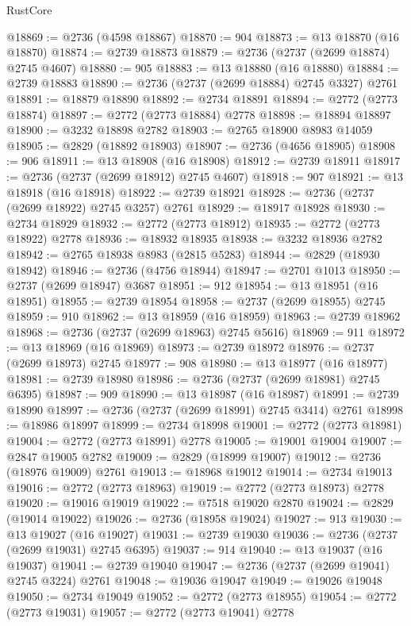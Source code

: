 \begin{lexlean}{RustCore}
\begin{coremodule}
@18869 := @2736 (@4598 @18867)
@18870 := 904
@18873 := @13 @18870 (@16 @18870)
@18874 := @2739 @18873
@18879 := @2736 (@2737 (@2699 @18874) @2745 @4607)
@18880 := 905
@18883 := @13 @18880 (@16 @18880)
@18884 := @2739 @18883
@18890 := @2736 (@2737 (@2699 @18884) @2745 @3327) @2761
@18891 := @18879 @18890
@18892 := @2734 @18891
@18894 := @2772 (@2773 @18874)
@18897 := @2772 (@2773 @18884) @2778
@18898 := @18894 @18897
@18900 := @3232 @18898 @2782
@18903 := @2765 @18900 @8983 @14059
@18905 := @2829 (@18892 @18903)
@18907 := @2736 (@4656 @18905)
@18908 := 906
@18911 := @13 @18908 (@16 @18908)
@18912 := @2739 @18911
@18917 := @2736 (@2737 (@2699 @18912) @2745 @4607)
@18918 := 907
@18921 := @13 @18918 (@16 @18918)
@18922 := @2739 @18921
@18928 := @2736 (@2737 (@2699 @18922) @2745 @3257) @2761
@18929 := @18917 @18928
@18930 := @2734 @18929
@18932 := @2772 (@2773 @18912)
@18935 := @2772 (@2773 @18922) @2778
@18936 := @18932 @18935
@18938 := @3232 @18936 @2782
@18942 := @2765 @18938 @8983 (@2815 @5283)
@18944 := @2829 (@18930 @18942)
@18946 := @2736 (@4756 @18944)
@18947 := @2701 @1013
@18950 := @2737 (@2699 @18947) @3687
@18951 := 912
@18954 := @13 @18951 (@16 @18951)
@18955 := @2739 @18954
@18958 := @2737 (@2699 @18955) @2745
@18959 := 910
@18962 := @13 @18959 (@16 @18959)
@18963 := @2739 @18962
@18968 := @2736 (@2737 (@2699 @18963) @2745 @5616)
@18969 := 911
@18972 := @13 @18969 (@16 @18969)
@18973 := @2739 @18972
@18976 := @2737 (@2699 @18973) @2745
@18977 := 908
@18980 := @13 @18977 (@16 @18977)
@18981 := @2739 @18980
@18986 := @2736 (@2737 (@2699 @18981) @2745 @6395)
@18987 := 909
@18990 := @13 @18987 (@16 @18987)
@18991 := @2739 @18990
@18997 := @2736 (@2737 (@2699 @18991) @2745 @3414) @2761
@18998 := @18986 @18997
@18999 := @2734 @18998
@19001 := @2772 (@2773 @18981)
@19004 := @2772 (@2773 @18991) @2778
@19005 := @19001 @19004
@19007 := @2847 @19005 @2782
@19009 := @2829 (@18999 @19007)
@19012 := @2736 (@18976 @19009) @2761
@19013 := @18968 @19012
@19014 := @2734 @19013
@19016 := @2772 (@2773 @18963)
@19019 := @2772 (@2773 @18973) @2778
@19020 := @19016 @19019
@19022 := @7518 @19020 @2870
@19024 := @2829 (@19014 @19022)
@19026 := @2736 (@18958 @19024)
@19027 := 913
@19030 := @13 @19027 (@16 @19027)
@19031 := @2739 @19030
@19036 := @2736 (@2737 (@2699 @19031) @2745 @6395)
@19037 := 914
@19040 := @13 @19037 (@16 @19037)
@19041 := @2739 @19040
@19047 := @2736 (@2737 (@2699 @19041) @2745 @3224) @2761
@19048 := @19036 @19047
@19049 := @19026 @19048
@19050 := @2734 @19049
@19052 := @2772 (@2773 @18955)
@19054 := @2772 (@2773 @19031)
@19057 := @2772 (@2773 @19041) @2778

\end{coremodule}
\end{lexlean}
